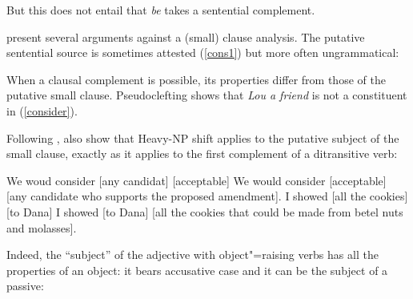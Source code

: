 \documentclass[output=paper
	        ,collection
	        ,collectionchapter
 	        ,biblatex
                ,babelshorthands
                ,newtxmath
                ,draftmode
                ,colorlinks, citecolor=brown
]{./langsci/langscibook}
\begin{document}
But this does not entail that \emph{be} takes a sentential complement. 




\citet[Chapter~3]{PollardandSag1994} present several arguments against a (small) clause analysis. The putative sentential source is sometimes attested (\ref{cons1}) but more often ungrammatical:

	
\eal
{}
\zl

	
When a clausal complement is possible, its properties differ from those of the putative small clause. Pseudoclefting shows that \textit{Lou a friend} is not a constituent in (\ref{consider}).

\eal
{}
\zl

Following \citet{Bresnan1982}, \citet[113]{PollardandSag1994} also show that Heavy-NP shift applies to the putative subject of the small clause, exactly as it applies to the first complement of a ditransitive verb:

\begin{exe}
\ex \begin{xlist}
\ex   We woud consider [any candidat] [acceptable]
\ex We would consider [acceptable]  [any candidate who supports the proposed amendment].
\ex   I showed [all the cookies] [to Dana]
\ex I showed [to Dana]  [all the cookies that could be made from betel nuts and molasses].  
\end{xlist}

\end{exe}

 Indeed, the ``subject'' of the adjective with object"=raising verbs has all the properties of an
 object: it bears accusative case and it can be the subject of a passive:
\end{document}
